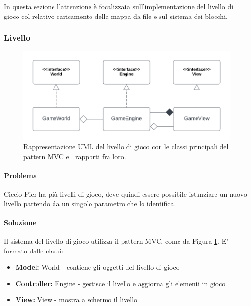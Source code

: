 \documentclass[a4paper,12pt]{report}
\begin{document}
    In questa sezione l'attenzione è focalizzata sull'implementazione del livello di gioco col relativo caricamento della mappa da file e sul sistema  dei blocchi.

    \subsubsection{Livello}

    \begin{figure}[H]
        \centering{}
        \includegraphics[scale=1] {img/livello-mvc.png}
        \caption{Rappresentazione UML del livello di gioco con le classi principali del pattern MVC e i rapporti fra loro.}
        \label{img:livello-mvc}
    \end{figure}

    \paragraph{Problema} Ciccio Pier ha più livelli di gioco, deve quindi essere possibile istanziare un nuovo livello partendo da un singolo parametro che lo identifica.

    \paragraph{Soluzione} Il sistema del livello di gioco utilizza il pattern MVC, come da Figura  \ref{img:livello-mvc}.
    E' formato dalle classi:

    \begin{itemize}
        \item \textbf{Model:} World - contiene gli oggetti del livello di gioco
        \item \textbf{Controller:} Engine - gestisce il livello e aggiorna gli elementi in gioco
        \item \textbf{View:} View - mostra a schermo il livello
    \end{itemize}
\end{document}
